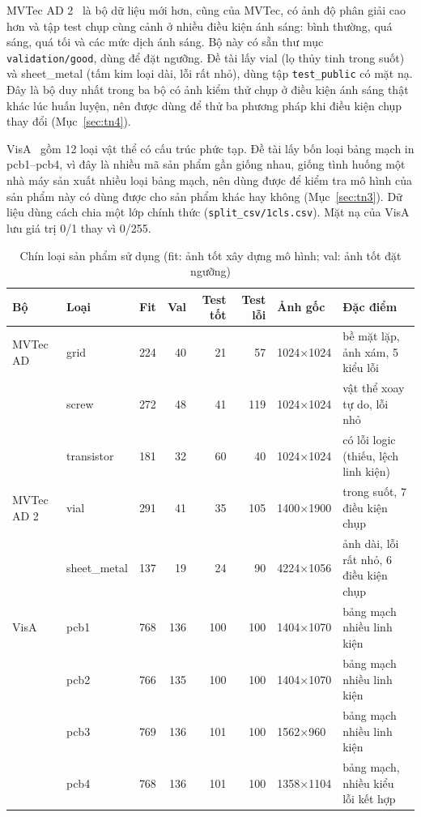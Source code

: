 MVTec AD 2~\cite{hecklerkramMVTecAD2Dataset2026} là bộ dữ liệu mới hơn, cũng của MVTec, có ảnh độ phân giải cao hơn
và tập test chụp cùng cảnh ở nhiều điều kiện ánh sáng: bình thường, quá sáng, quá tối và các mức dịch ánh sáng. Bộ
này có sẵn thư mục \texttt{validation/good}, dùng để đặt ngưỡng. Đề tài lấy vial (lọ thủy tinh trong suốt) và
sheet\_metal (tấm kim loại dài, lỗi rất nhỏ), dùng tập \texttt{test\_public} có mặt nạ. Đây là bộ duy nhất trong ba bộ có ảnh kiểm thử chụp ở điều kiện ánh sáng
thật khác lúc huấn luyện, nên được dùng để thử ba phương pháp khi điều kiện chụp thay đổi (Mục~\ref{sec:tn4}).

VisA~\cite{zouSPotDifferenceSelfsupervisedPretraining2022} gồm 12 loại vật thể có cấu trúc phức tạp. Đề tài lấy bốn
loại bảng mạch in pcb1--pcb4, vì đây là nhiều mã sản phẩm gần giống nhau, giống tình huống một nhà máy sản xuất
nhiều loại bảng mạch, nên dùng được để kiểm tra mô hình của sản phẩm này có dùng được cho sản phẩm khác hay không
(Mục~\ref{sec:tn3}). Dữ liệu dùng cách chia một lớp chính thức (\texttt{split\_csv/1cls.csv}). Mặt nạ của VisA lưu
giá trị 0/1 thay vì 0/255.

\begin{table}[htbp]
  \centering
  \caption[Chín loại sản phẩm sử dụng]{Chín loại sản phẩm sử dụng (fit: ảnh tốt xây dựng mô hình; val: ảnh tốt đặt
    ngưỡng)}
  \label{tab:mvtec}
  \small
  \begin{tabular}{@{}llrrrrl>{\raggedright\arraybackslash}p{3.9cm}@{}}
    \toprule
    Bộ & Loại & Fit & Val & Test tốt & Test lỗi & Ảnh gốc & Đặc điểm \\
    \midrule
    MVTec AD   & grid        & 224 &  40 &  21 &  57 & 1024×1024 & bề mặt lặp, ảnh xám, 5 kiểu lỗi \\
               & screw       & 272 &  48 &  41 & 119 & 1024×1024 & vật thể xoay tự do, lỗi nhỏ \\
               & transistor  & 181 &  32 &  60 &  40 & 1024×1024 & có lỗi logic (thiếu, lệch linh kiện) \\
    \midrule
    MVTec AD 2 & vial        & 291 &  41 &  35 & 105 & 1400×1900 & trong suốt, 7 điều kiện chụp \\
               & sheet\_metal & 137 &  19 &  24 &  90 & 4224×1056 & ảnh dài, lỗi rất nhỏ, 6 điều kiện chụp \\
    \midrule
    VisA       & pcb1        & 768 & 136 & 100 & 100 & 1404×1070 & bảng mạch nhiều linh kiện \\
               & pcb2        & 766 & 135 & 100 & 100 & 1404×1070 & bảng mạch nhiều linh kiện \\
               & pcb3        & 769 & 136 & 101 & 100 & 1562×960  & bảng mạch nhiều linh kiện \\
               & pcb4        & 768 & 136 & 101 & 100 & 1358×1104 & bảng mạch, nhiều kiểu lỗi kết hợp \\
    \bottomrule
  \end{tabular}
\end{table}


